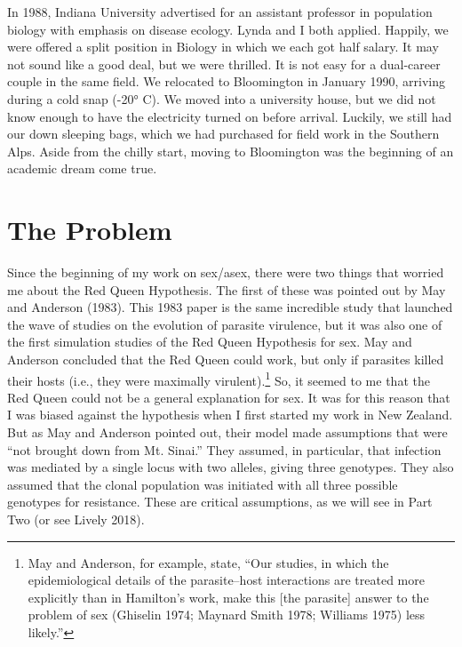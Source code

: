 \documentclass[
  letterpaper,
]{book}
\begin{document}
In 1988, Indiana University advertised for an assistant professor in
population biology with emphasis on disease ecology. Lynda and I both
applied. Happily, we were offered a split position in Biology in which
we each got half salary. It may not sound like a good deal, but we were
thrilled. It is not easy for a dual-career couple in the same field. We
relocated to Bloomington in January 1990, arriving during a cold snap
(-20° C). We moved into a university house, but we did not know enough
to have the electricity turned on before arrival. Luckily, we still had
our down sleeping bags, which we had purchased for field work in the
Southern Alps. Aside from the chilly start, moving to Bloomington was
the beginning of an academic dream come true.

\section{The Problem}\label{the-problem-1}

Since the beginning of my work on sex/asex, there were two things that
worried me about the Red Queen Hypothesis. The first of these was
pointed out by May and Anderson (1983). This 1983 paper is the same
incredible study that launched the wave of studies on the evolution of
parasite virulence, but it was also one of the first simulation studies
of the Red Queen Hypothesis for sex. May and Anderson concluded that the
Red Queen could work, but only if parasites killed their hosts (i.e.,
they were maximally virulent).\footnote{May and Anderson, for example,
  state, ``Our studies, in which the epidemiological details of the
  parasite--host interactions are treated more explicitly than in
  Hamilton's work, make this {[}the parasite{]} answer to the problem of
  sex (Ghiselin 1974; Maynard Smith 1978; Williams 1975) less likely.''}
So, it seemed to me that the Red Queen could not be a general
explanation for sex. It was for this reason that I was biased against
the hypothesis when I first started my work in New Zealand. But as May
and Anderson pointed out, their model made assumptions that were ``not
brought down from Mt. Sinai.'' They assumed, in particular, that
infection was mediated by a single locus with two alleles, giving three
genotypes. They also assumed that the clonal population was initiated
with all three possible genotypes for resistance. These are critical
assumptions, as we will see in Part Two (or see Lively 2018).
\end{document}
